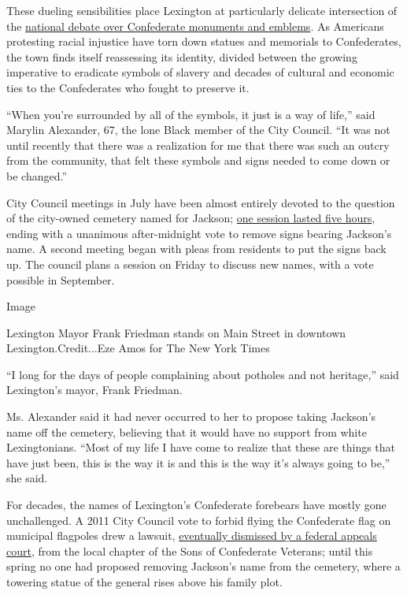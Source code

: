 These dueling sensibilities place Lexington at particularly delicate
intersection of the
\href{https://www.nytimes3xbfgragh.onion/2020/06/24/us/confederate-statues-photos.html}{national
debate over Confederate monuments and emblems}. As Americans protesting
racial injustice have torn down statues and memorials to Confederates,
the town finds itself reassessing its identity, divided between the
growing imperative to eradicate symbols of slavery and decades of
cultural and economic ties to the Confederates who fought to preserve
it.

``When you're surrounded by all of the symbols, it just is a way of
life,'' said Marylin Alexander, 67, the lone Black member of the City
Council. ``It was not until recently that there was a realization for me
that there was such an outcry from the community, that felt these
symbols and signs needed to come down or be changed.''

City Council meetings in July have been almost entirely devoted to the
question of the city-owned cemetery named for Jackson;
\href{https://www.youtube.com/watch?v=Ip6tg5VIbCE}{one session lasted
five hours}, ending with a unanimous after-midnight vote to remove signs
bearing Jackson's name. A second meeting began with pleas from residents
to put the signs back up. The council plans a session on Friday to
discuss new names, with a vote possible in September.

Image

Lexington Mayor Frank Friedman stands on Main Street in downtown
Lexington.Credit...Eze Amos for The New York Times

``I long for the days of people complaining about potholes and not
heritage,'' said Lexington's mayor, Frank Friedman.

Ms. Alexander said it had never occurred to her to propose taking
Jackson's name off the cemetery, believing that it would have no support
from white Lexingtonians. ``Most of my life I have come to realize that
these are things that have just been, this is the way it is and this is
the way it's always going to be,'' she said.

For decades, the names of Lexington's Confederate forebears have mostly
gone unchallenged. A 2011 City Council vote to forbid flying the
Confederate flag on municipal flagpoles drew a lawsuit,
\href{https://casetext.com/case/sons-of-confederate-veterans-v-city-of-lexington-2}{eventually
dismissed by a federal appeals court}, from the local chapter of the
Sons of Confederate Veterans; until this spring no one had proposed
removing Jackson's name from the cemetery, where a towering statue of
the general rises above his family plot.

